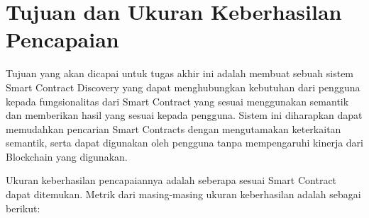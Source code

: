 \section{Tujuan dan Ukuran Keberhasilan Pencapaian}
\label{sec:tujuan-ukuran-keberhasilan-pencapaian}


Tujuan yang akan dicapai untuk tugas akhir ini adalah membuat sebuah sistem Smart Contract Discovery yang dapat menghubungkan kebutuhan dari pengguna kepada fungsionalitas dari Smart Contract yang sesuai menggunakan semantik dan memberikan hasil yang sesuai kepada pengguna. Sistem ini diharapkan dapat memudahkan pencarian Smart Contracts dengan mengutamakan keterkaitan semantik, serta dapat digunakan oleh pengguna tanpa mempengaruhi kinerja dari Blockchain yang digunakan.

Ukuran keberhasilan pencapaiannya adalah seberapa sesuai Smart Contract dapat ditemukan. Metrik dari masing-masing ukuran keberhasilan adalah sebagai berikut:


